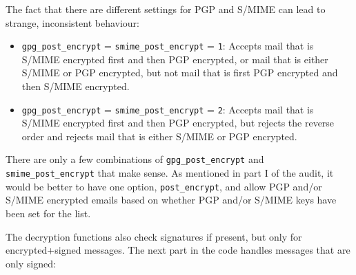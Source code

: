 \documentclass[a4]{article}
\newcommand{\var}[1]{\texttt{#1}}
\newcommand{\val}[1]{\texttt{#1}}
\begin{document}
The fact that there are different settings for PGP and S/MIME can lead to strange, inconsistent behaviour:
\begin{itemize}
\item \var{gpg\_post\_encrypt} = \var{smime\_post\_encrypt} = \val{1}:
      Accepts mail that is S/MIME encrypted first and then PGP encrypted,
      or mail that is either S/MIME or PGP encrypted,
      but not mail that is first PGP encrypted and then S/MIME encrypted.
\item \var{gpg\_post\_encrypt} = \var{smime\_post\_encrypt} = \val{2}:
      Accepts mail that is S/MIME encrypted first and then PGP encrypted,
      but rejects the reverse order and rejects mail that is either S/MIME or PGP encrypted.
\end{itemize}
There are only a few combinations of \var{gpg\_post\_encrypt} and \var{smime\_post\_encrypt} that make sense.
As mentioned in part I of the audit, it would be better to have one option, \var{post\_encrypt},
and allow PGP and/or S/MIME encrypted emails based on whether PGP and/or S/MIME keys have been set for the list.

The decryption functions also check signatures if present, but only for encrypted+signed messages.
The next part in the code handles messages that are only signed:
\end{document}
